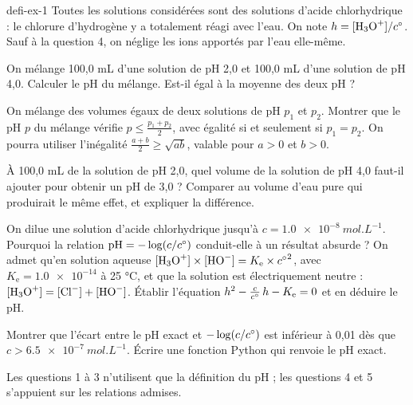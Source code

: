 \begin{blocEdition}{defi-ex-1}
Toutes les solutions considérées sont des solutions d'acide chlorhydrique : le chlorure d'hydrogène
y a totalement réagi avec l'eau. On note $h=\hho/\cst$. Sauf à la question 4, on néglige les ions
apportés par l'eau elle-même.
\label{figedition-defi-ex-1-1}
\begin{questions}
\item On mélange 100,0 mL d'une solution de pH 2,0 et 100,0 mL d'une solution de pH 4,0.
Calculer le pH du mélange. Est-il égal à la moyenne des deux pH ?
\item On mélange des volumes égaux de deux solutions de pH $p_1$ et $p_2$. Montrer que le pH $p$ du
mélange vérifie $p\leq\frac{p_1+p_2}{2}$, avec égalité si et seulement si $p_1=p_2$.
On pourra utiliser l'inégalité $\frac{a+b}{2}\geq\sqrt{ab}$, valable pour $a>0$ et $b>0$.
\item À 100,0 mL de la solution de pH 2,0, quel volume de la solution de pH 4,0 faut-il ajouter pour
obtenir un pH de 3,0 ? Comparer au volume d'eau pure qui produirait le même effet, et expliquer la différence.
\item On dilue une solution d'acide chlorhydrique jusqu'à $c=\qty{1,0e-8}{mol.L^{-1}}$.
Pourquoi la relation $\mathrm{pH}=-\log(c/c^{\circ})$ conduit-elle à un résultat absurde ?
On admet qu'en solution aqueuse $\hho\times[\ce{HO-}]=K_\mathrm{e}\times{\cst}^2$, avec
$K_\mathrm{e}=\num{1.0e-14}$ à 25 °C, et que la solution est électriquement neutre :
$\hho=[\ce{Cl-}]+[\ce{HO-}]$. Établir l'équation $h^2-\frac{c}{c^{\circ}}\,h-K_\mathrm{e}=0$ et en déduire le pH.
\item Montrer que l'écart entre le pH exact et $-\log(c/c^{\circ})$ est inférieur à 0,01 dès que
$c>\qty{6,5e-7}{mol.L^{-1}}$. Écrire une fonction Python  qui renvoie le pH exact.
\end{questions}
Les questions 1 à 3 n'utilisent que la définition du pH ; les questions 4 et 5 s'appuient sur les relations admises.
\end{blocEdition}

